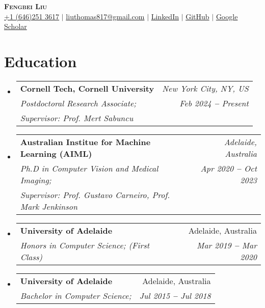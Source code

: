\documentclass[letterpaper,11pt]{article}
\makeatletter
\newcommand{\resumeSubheading}[4]{
  \vspace{-2pt}\item
    \begin{tabular*}{0.97\textwidth}[t]{l@{\extracolsep{\fill}}r}
      \textbf{#1} & #2 \\
      \textit{\small#3} & \textit{\small #4} \\
    \end{tabular*}\vspace{-7pt}
}
\newcommand{\resumePhdheading}[5]{
  \vspace{-2pt}\item
    \begin{tabular*}{0.97\textwidth}[t]{l@{\extracolsep{\fill}}r}
      \textbf{#1} & \textit{\small #2}\\
      \textit{\small#3} & \textit{\small #4} \\
      \textit{\small #5} \\
    \end{tabular*}\vspace{-7pt}
}
\newcommand{\resumeSubHeadingListStart}{\begin{itemize}[leftmargin=0.15in, label={}]}
\newcommand{\resumeSubHeadingListEnd}{\end{itemize}}
\makeatother
\begin{document}

\begin{center}
    \textbf{\Huge \scshape Fengbei Liu} \\ \vspace{3pt}
    \small
    \faMobile \hspace{.5pt} \href{tel:905314204536}{+1 (646)251 3617}
    $|$
    \faAt \hspace{.5pt} \href{mailto:liuthomas817@gmail.com}{liuthomas817@gmail.com}
    $|$
    \faLinkedinSquare \hspace{.5pt} \href{https://www.linkedin.com/in/fengbei-liu-2bb11b177/}{LinkedIn}
    $|$
    \faGithub \hspace{.5pt} \href{https://github.com/FBLADL?tab=repositories}{GitHub}
    $|$
    \faGlobe \hspace{.5pt} \href{https://scholar.google.com.au/citations?user=oY_qRxMAAAAJ&hl}{Google Scholar}
\end{center}




\section{Education}
  \vspace{3pt}
  \resumeSubHeadingListStart

    

    \resumePhdheading{Cornell Tech, Cornell University}{New York City, NY, US}{Postdoctoral Research Associate; }{Feb 2024 \textbf{--} Present}{Supervisor: Prof. Mert Sabuncu}
    \resumePhdheading
      {Australian Institue for Machine Learning (AIML)
      }{Adelaide, Australia}
      {Ph.D in Computer Vision and Medical Imaging;   }{Apr 2020 \textbf{--} Oct 2023}{Supervisor: Prof. Gustavo Carneiro, Prof. Mark Jenkinson}
    \resumeSubheading{University of Adelaide}{Adelaide, Australia}{Honors in Computer Science; (First Class)}{Mar 2019 \textbf{--} Mar 2020}
    \resumeSubheading{University of Adelaide}{Adelaide, Australia}{Bachelor in Computer Science; }{Jul 2015 \textbf{--} Jul 2018}
  \resumeSubHeadingListEnd
\end{document}
